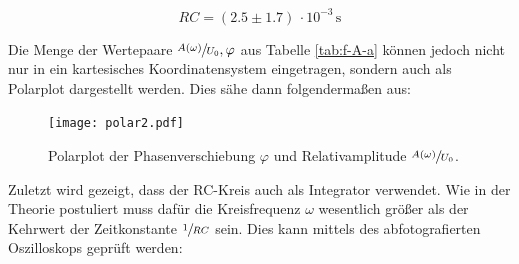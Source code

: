 \begin{equation}
    RC = \left(2.5 \pm 1.7 \right)\,\cdot 10^{-3}\,\unit{\second}
\end{equation}


\noindent Die Menge der Wertepaare ${\sfrac{A(\omega)}{U_0},\varphi}$ aus Tabelle \ref{tab:f-A-a} können jedoch nicht nur in ein kartesisches Koordinatensystem eingetragen, sondern
auch als Polarplot dargestellt werden. Dies sähe dann folgendermaßen aus:

\begin{figure}[H]
    \centering
    \texttt{[image: polar2.pdf]}
    \caption{Polarplot der Phasenverschiebung $\varphi$ und Relativamplitude $\sfrac{A(\omega)}{U_0}$.}
    \label{fig:polar}
\end{figure}

\noindent Zuletzt wird gezeigt, dass der RC-Kreis auch als Integrator verwendet. Wie in der Theorie postuliert muss dafür die Kreisfrequenz $\omega$
wesentlich größer als der Kehrwert der Zeitkonstante $\sfrac{1}{RC}$ sein. Dies kann mittels des abfotografierten Oszilloskops geprüft werden:

